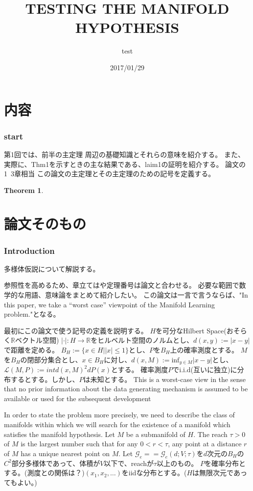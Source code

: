 \documentclass{jarticle}
\title{TESTING THE MANIFOLD HYPOTHESIS}
\author{test}
\date{2017/01/29}
\newtheorem{thm}{Theorem}[section]
\begin{document}
\part{内容}

\section{start}
\label{start}
第1回では、前半の主定理
周辺の基礎知識とそれらの意味を紹介する。
また、実際に、Thm1を示すときの主な結果である、laim1の証明を紹介する。
論文の1~3章相当
この論文の主定理とその主定理のための記号を定義する。
\begin{thm}

\end{thm}


\part{論文そのもの}

\setcounter{section}{0}
\section{Introduction}
\label{sec:Introduction}
多様体仮説について解説する。

参照性を高めるため、章立てはや定理番号は論文と合わせる。
必要な範囲で数学的な用語、意味論をまとめて紹介したい。
この論文は一言で言うならば、"In this paper, we take a “worst case” viewpoint of the Manifold Learning problem."となる。

最初にこの論文で使う記号の定義を説明する。
$H$を可分なHilbert Space(おそらく$\mathbb{R}$ベクトル空間)
$| \cdot |:H \to \mathbb{R}$をヒルベルト空間のノルムとし、$d(x,y):=|x-y|$で距離を定める。
$B_H:=\{x \in H| |x| \le 1\}$とし、$P$を$B_H$上の確率測度とする。
$M$を$B_H$の閉部分集合とし、$x \in B_H$に対し、$d(x,M):=\mathrm{inf}_{y \in M}|x -y |$とし、
$\mathcal{L}(M,P):=int d(x,M)^2 dP(x)$とする。
確率測度$P$でi.i.d(互いに独立)に分布するとする。しかし、$P$は未知とする。
This is a worst-case view in the sense that no prior information
about the data generating mechanism is assumed to be available or used for the subsequent development

In order to state the problem more precisely, we need to describe the class of manifolds within which we
will search for the existence of a manifold which satisfies the manifold hypothesis.
Let $M$ be a submanifold of $H$. The reach $ \tau > 0$ of $M$ is the largest number such that
for any $0 < r < \tau$, any point at a distance $r$ of $M$ has a unique nearest point on $M$.
Let $\mathcal{G}_e == \mathcal{G}_e(d; V;\tau)$を$d$次元の$B_H$の$C^2$部分多様体であって、体積が$V$以下で、reachが$\tau$以上のもの。
$P$を確率分布とする。(測度との関係は？)$(x_1,x_2,\dots)$をiidな分布とする。($H$は無限次元であってもよい。)
\end{document}
